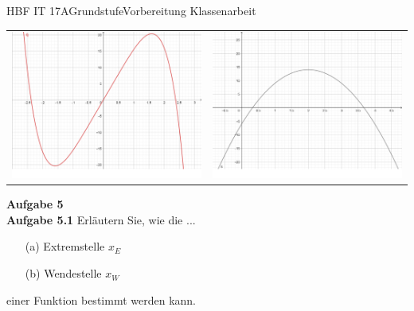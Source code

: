 \documentclass[oneside,openany,headings=optiontotoc,11pt,numbers=noenddot]{scrreprt}
\begin{document}
\begin{worksheet}{HBF IT 17A}{Grundstufe}{Vorbereitung Klassenarbeit}
\begin{framed}
\begin{tabularx}{\textwidth}{X|X}
				\includegraphics[scale=0.25]{Bilder/KAUebungBilder/q0.png} & \includegraphics[scale=0.25]{Bilder/KAUebungBilder/s0.png}\\
			\end{tabularx}
			\textbf{Aufgabe 5}\\
			\indent\textbf{Aufgabe 5.1}
			Erläutern Sie, wie die ...
			\begin{itemize}
				\item[(a)] Extremstelle \(x_E\)
				\item[(b)] Wendestelle \(x_W\)
			\end{itemize}
			einer Funktion bestimmt werden kann.\\

\end{framed}
\end{worksheet}
\end{document}

